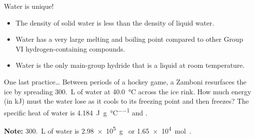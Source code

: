 \documentclass[notes=hide]{beamer}
\begin{document}
\begin{frame}{Water is unique!}
	\begin{itemize}
		\item The density of solid water is \alert{less} than the
			density of liquid water.
		\item Water has a very large melting and boiling point
			compared to other Group VI hydrogen-containing
			compounds.
		\item Water is the \alert{only} main-group hydride that
			is a liquid at room temperature.
	\end{itemize}
	\begin{center}
	\end{center}
\end{frame}

\clearpage

\begin{frame}[t]{One last practice\ldots}
	Between periods of a hockey game, a Zamboni resurfaces the ice by
	spreading \SI{300.}{\liter} of water at \SI{40.0}{\celsius} across the
	ice rink.  How much energy (in \si{\kilo\joule}) must the water lose as
	it cools to its freezing point and then freezes? The specific heat of
	water is \SI{4.184}{\joule\per\gram\per\celsius} and
	.

	\textbf{Note:} \SI{300.}{\liter} of water is \SI{2.98e5}{\gram}~
	or \SI{1.65e4}{\mole}~.

\end{frame}
\end{document}
